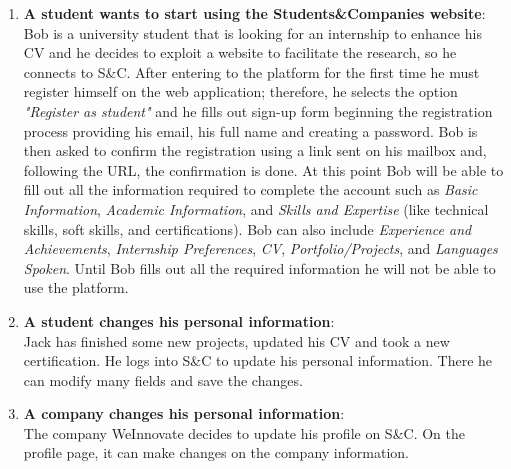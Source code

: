         \begin{enumerate}
            
            \item \textbf{A student wants to start using the Students\&Companies website}:
            \\Bob is a university student that is looking for an internship to enhance his CV and he decides to exploit a website to facilitate the research, so he connects to S\&C. After entering to the platform for the first time he must register himself on the web application; therefore, he selects the option \textit{"Register as student"} and he fills out sign-up form beginning the registration process providing his email, his full name and creating a password. Bob is then asked to confirm the registration using a link sent on his mailbox and, following the URL, the confirmation is done. At this point Bob will be able to fill out all the information required to complete the account such as \textit{Basic Information}, \textit{Academic Information}, and \textit{Skills and Expertise} (like technical skills, soft skills, and certifications). Bob can also include \textit{Experience and Achievements}, \textit{Internship Preferences}, \textit{CV}, \textit{Portfolio/Projects}, and \textit{Languages Spoken}. Until Bob fills out all the required information he will not be able to use the platform.
            
            \item \textbf{A student changes his personal information}:
            \\ Jack has finished some new projects, updated his CV and took a new certification. He logs into S\&C to update his personal information. There he can modify many fields and save the changes. 
            
            \item \textbf{A company changes his personal information}:
            \\ The company WeInnovate decides to update his profile on S\&C. On the profile page, it can make changes on the company information.  
            

\end{enumerate}
